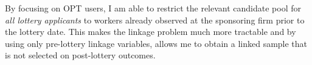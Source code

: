 By focusing on OPT users, I am able to restrict the relevant candidate pool for \textit{all lottery applicants} to workers already observed at the sponsoring firm prior to the lottery date. This makes the linkage problem much more tractable and by using only pre-lottery linkage variables, allows me to obtain a linked sample that is not selected on post-lottery outcomes.








